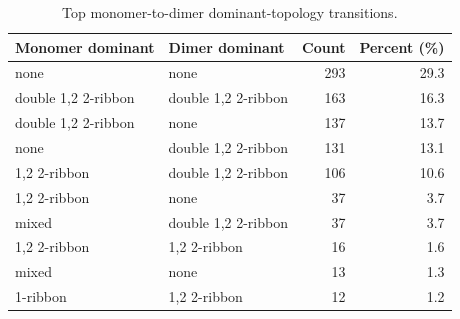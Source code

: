 \begin{table}[ht]
\centering
\caption{Top monomer-to-dimer dominant-topology transitions.}
\label{tab:top-transitions}
\begin{tabular}{llrr}
\toprule
Monomer dominant & Dimer dominant & Count & Percent (\%) \\
\midrule
none & none & 293 & 29.3 \\
double 1,2 2-ribbon & double 1,2 2-ribbon & 163 & 16.3 \\
double 1,2 2-ribbon & none & 137 & 13.7 \\
none & double 1,2 2-ribbon & 131 & 13.1 \\
1,2 2-ribbon & double 1,2 2-ribbon & 106 & 10.6 \\
1,2 2-ribbon & none & 37 & 3.7 \\
mixed & double 1,2 2-ribbon & 37 & 3.7 \\
1,2 2-ribbon & 1,2 2-ribbon & 16 & 1.6 \\
mixed & none & 13 & 1.3 \\
1-ribbon & 1,2 2-ribbon & 12 & 1.2 \\
\bottomrule
\end{tabular}
\end{table}
